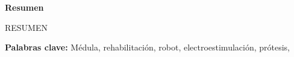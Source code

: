 \documentclass[a4paper,11pt]{book}
\begin{document}
\begin{center}
\Huge{\textbf{Resumen}}
\end{center}

RESUMEN

\textbf{Palabras clave:} Médula, rehabilitación, robot, electroestimulación, prótesis, 



\tableofcontents

\mainmatter  %










%


\end{document}
